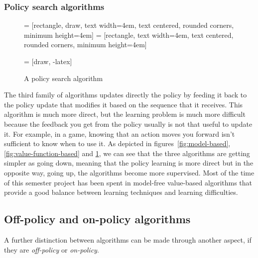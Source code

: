 \subsubsection{Policy search algorithms}
\begin{figure} [ht]
     = [rectangle, draw, 
        text width=4em, text centered, rounded corners, minimum height=4em]
     = [rectangle, 
        text width=4em, text centered, rounded corners, minimum height=4em]
        
     = [draw, -latex]
    \centering
    \caption{A policy search algorithm}
    \label{fig:policy-search}
\end{figure}
\noindent
The third family of algorithms updates directly the policy by feeding it back to the policy update that modifies it based on the sequence that it receives. This algorithm is much more direct, but the learning problem is much more difficult because the feedback you get from the policy usually is not that useful to update it. For example, in a game, knowing that an action moves you forward isn't sufficient to know when to use it.
\newline
\newline
As depicted in figures~\ref{fig:model-based}, \ref{fig:value-function-based} and \ref{fig:policy-search}, we can see that the three algorithms are getting simpler as going down, meaning that the policy learning is more direct but in the opposite way, going up, the algorithms become more supervised. Most of the time of this semester project has been spent in model-free value-based algorithms that provide a good balance between learning techniques and learning difficulties.

\subsection{Off-policy and on-policy algorithms}
A further distinction between algorithms can be made through another aspect, if they are \textit{off-policy} or \textit{on-policy}.

